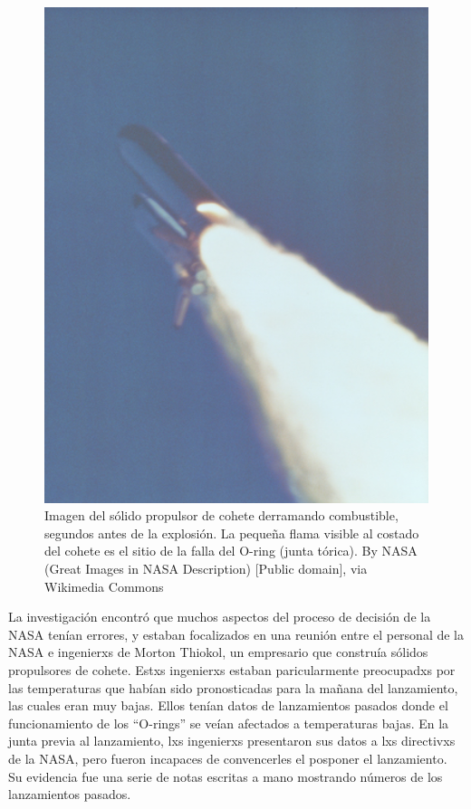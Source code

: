 \documentclass[
  12pt,
]{book}
\begin{document}
\begin{figure}
\includegraphics[width=5in,height=0.2\textheight]{images/Booster_Rocket_Breach_-_GPN-2000-001425} \caption{Imagen del sólido propulsor de cohete derramando combustible, segundos antes de la explosión. La pequeña flama visible al costado del cohete es el sitio de la falla del O-ring (junta tórica). By NASA (Great Images in NASA Description) [Public domain], via Wikimedia Commons}\label{fig:srbLeak}
\end{figure}

La investigación encontró que muchos aspectos del proceso de decisión de la NASA tenían errores, y estaban focalizados en una reunión entre el personal de la NASA e ingenierxs de Morton Thiokol, un empresario que construía sólidos propulsores de cohete. Estxs ingenierxs estaban paricularmente preocupadxs por las temperaturas que habían sido pronosticadas para la mañana del lanzamiento, las cuales eran muy bajas. Ellos tenían datos de lanzamientos pasados donde el funcionamiento de los ``O-rings'' se veían afectados a temperaturas bajas. En la junta previa al lanzamiento, lxs ingenierxs presentaron sus datos a lxs directivxs de la NASA, pero fueron incapaces de convencerles el posponer el lanzamiento. Su evidencia fue una serie de notas escritas a mano mostrando números de los lanzamientos pasados.
\end{document}
